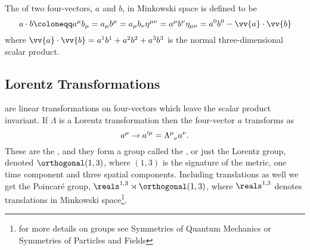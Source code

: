 \documentclass[fleqn]{NotesClass}
\newcommand{\minkowskiMetric}{\eta}
\begin{document}
\begin{appendices}
        The  of two four-vectors, \(a\) and \(b\), in Minkowski space is defined to be
        \begin{equation}
            a \cdot b \coloneqq a^\mu b_\mu = a_\mu b^\mu = a_\mu b_\nu \minkowskiMetric^{\mu\nu} = a^\mu b^\nu \minkowskiMetric_{\mu\nu} = a^0b^0 - \vv{a} \cdot \vv{b}
        \end{equation}
        where \(\vv{a} \cdot \vv{b} = a^1b^1 + a^2b^2 + a^3b^3\) is the normal three-dimensional scalar product.
        
        \subsection{Lorentz Transformations}
         are linear transformations on four-vectors which leave the scalar product invariant.
        If \(\Lambda\) is a Lorentz transformation then the four-vector \(a\) transforms as
        \begin{equation}
            a^\mu \to a'^\mu = \tensor{\Lambda}{^\mu_\nu} a^\nu.
        \end{equation}
        These are the , and they form a group called the , or just the Lorentz group, denoted \(\orthogonal(1, 3)\), where \((1,3)\) is the signature of the metric, one time component and three spatial components.
        Including translations as well we get the Poincar\'e group, \(\reals^{1,3} \rtimes \orthogonal(1, 3)\), where \(\reals^{1,3}\) denotes translations in Minkowski space\footnote{for more details on groups see Symmetries of Quantum Mechanics or Symmetries of Particles and Fields}.
        

\end{appendices}
\end{document}
